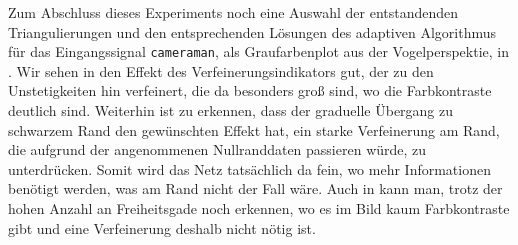 Zum Abschluss dieses Experiments noch eine Auswahl der entstandenden
Triangulierungen und den entsprechenden Lösungen des adaptiven Algorithmus für
das Eingangssignal \texttt{cameraman}, als Graufarbenplot aus der
Vogelperspektie, in .
Wir sehen in  den Effekt des Verfeinerungsindikators
gut, der zu den Unstetigkeiten hin verfeinert, die da besonders groß sind,
wo die Farbkontraste deutlich sind. 
Weiterhin ist zu erkennen, dass der graduelle Übergang zu schwarzem Rand
den gewünschten Effekt hat, ein starke Verfeinerung am Rand, die aufgrund der 
angenommenen Nullranddaten passieren würde, zu unterdrücken.
Somit wird das Netz tatsächlich da fein, wo mehr Informationen benötigt werden,
was am Rand nicht der Fall wäre.
Auch in  kann man, trotz der hohen Anzahl
an Freiheitsgade noch erkennen, wo es im Bild kaum Farbkontraste gibt und eine
Verfeinerung deshalb nicht nötig ist.

